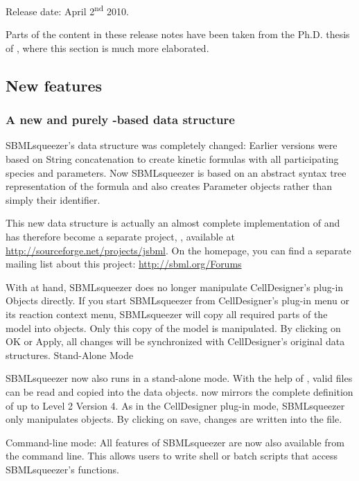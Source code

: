 Release date: April 2\textsuperscript{nd} 2010.

Parts of the content in these release notes have been taken from the Ph.D.
thesis of \citealp{Draeger2011a}, where this section is much more elaborated.

\subsection{New features}

\subsubsection{A new and purely \Java-based \SBML data structure}

SBMLsqueezer's data structure was completely changed: Earlier versions were
based on String concatenation to create kinetic formulas with all participating
species and parameters. Now SBMLsqueezer is based on an abstract syntax tree
representation of the formula and also creates Parameter objects rather than
simply their identifier.

This new data structure is actually an almost complete \Java implementation of
\SBML and has therefore become a separate project, \JSBML, available at
\url{http://sourceforge.net/projects/jsbml}. On the \SBML homepage, you can find
a separate mailing list about this project: \url{http://sbml.org/Forums}

With \JSBML at hand, SBMLsqueezer does no longer manipulate CellDesigner's
plug-in Objects directly. If you start SBMLsqueezer from CellDesigner's plug-in
menu or its reaction context menu, SBMLsqueezer will copy all required parts of
the model into \JSBML objects. Only this copy of the model is manipulated. By
clicking on OK or Apply, all changes will be synchronized with CellDesigner's
original data structures.
Stand-Alone Mode

SBMLsqueezer now also runs in a stand-alone mode. With the help of \libSBML,
valid \SBML files can be read and copied into the \JSBML data objects. \JSBML now
mirrors the complete definition of \SBML up to Level 2 Version 4. As in the
CellDesigner plug-in mode, SBMLsqueezer only manipulates \JSBML objects. By
clicking on save, changes are written into the \SBML file.

Command-line mode: All features of SBMLsqueezer are now also available from the
command line. This allows users to write shell or batch scripts that access
SBMLsqueezer's functions.

